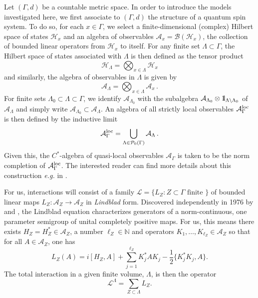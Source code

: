 \documentclass{article}
\def\idty{{\mathchoice {\mathrm{1\mskip-4mu l}} {\mathrm{1\mskip-4mu l}} %
{\mathrm{1\mskip-4.5mu l}} {\mathrm{1\mskip-5mu l}}}}
\newcommand{\<}{\langle}
\renewcommand{\>}{\rangle}
\numberwithin{equation}{section}
\theoremstyle{definition}
\begin{document}
Let $(\Gamma, d)$ be a countable metric space. In order to introduce the models investigated here, we first associate to $(\Gamma, d)$ the 
structure of a quantum spin system. To do so, for each $x \in \Gamma$, we select a finite-dimensional (complex) Hilbert space of
states $\mathcal{H}_x$ and an algebra of observables $\mathcal{A}_x = \mathcal{B}( \mathcal{H}_x)$, the collection of 
bounded linear operators from $\mathcal{H}_x$ to itself. For any finite set $\Lambda \subset \Gamma$, the Hilbert space of
states associated with $\Lambda$ is then defined as the tensor product
\begin{equation} \label{local_hs}
\mathcal{H}_{\Lambda} = \bigotimes_{x \in \Lambda} \mathcal{H}_x 
\end{equation}
and similarly, the algebra of observables in $\Lambda$ is given by
\begin{equation} \label{local_alg}
\mathcal{A}_{\Lambda} = \bigotimes_{x \in \Lambda} \mathcal{A}_x \, .
\end{equation}
For finite sets $\Lambda_0 \subset \Lambda \subset \Gamma$, we identify $\mathcal{A}_{\Lambda_0}$
with the subalgebra $\mathcal{A}_{\Lambda_0} \otimes \idty_{\Lambda \setminus \Lambda_0}$ of $\mathcal{A}_{\Lambda}$ and
simply write $\mathcal{A}_{\Lambda_0} \subset \mathcal{A}_{\Lambda}$. An algebra of all strictly local observables $\mathcal{A}_{\Gamma}^{\rm loc}$ is then defined by the
inductive limit
\begin{equation}
\mathcal{A}_{\Gamma}^{\rm loc} = \bigcup_{\Lambda \in \mathcal{P}_0(\Gamma)} \mathcal{A}_{\Lambda}  \, .
\end{equation}
Given this, the $C^*$-algebra of quasi-local observables $\mathcal{A}_{\Gamma}$ is taken to be the
norm completion of $\mathcal{A}_{\Gamma}^{\rm loc}$.  The interested reader can find more details about this
construction \textit{e.g.} in \cite{BratteliRobinson_1, BratteliRobinson_2}. 

%
%
	For us, interactions will consist of a family $\mathscr{L} = \{L_Z: Z\subset \Gamma \text{ finite }\}$ of bounded linear maps $L_Z:\mathcal{A}_Z \to \mathcal{A}_Z$ in {\em Lindblad} form. Discovered independently in 1976 by \cite{Lindblad} and \cite{GoriniKossakowskiSudarshan}, the Lindblad equation characterizes generators of a norm-continuous, one parameter semigroup of unital completely positive maps. For us, this means there exists $H_Z = H_Z^*\in \mathcal{A}_Z$, a number $\ell_Z\in \mathbb{N}$ and operators $K_1, \dots, K_{\ell_Z}\in \mathcal{A}_Z$ so that for all $A\in \mathcal{A}_Z$, one has
	\begin{equation}\label{eqn:lindblad_equation}
		L_Z(A) = i[H_Z, A] + \sum_{j=1}^{\ell_Z} K_j^*AK_j - \frac{1}{2}\{K_j^*K_j, A\}.
	\end{equation} The total interaction in a given finite volume, $\Lambda$, is then the operator 
	\begin{equation}
		\mathscr{L}^{\Lambda} = \sum_{Z\subset \Lambda} L_Z.
	\end{equation}
	
\end{document}
